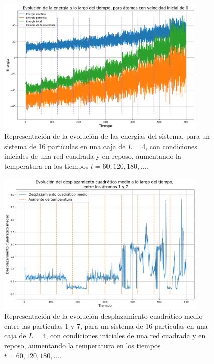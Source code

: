 \documentclass[11pt, twoside]{article} %
\begin{document}
\begin{figure}[h!]
    \centering
    \includegraphics[width=0.9\textwidth]{plots/energia_temp_crit.png}
    \caption{Representación de la evolución de las energías del sistema, para un sistema
    de 16 partículas en una caja de $L=4$, con condiciones iniciales de una red cuadrada 
    y en reposo, aumentando la temperatura en los tiempos $t=60, 120, 180, ...$.}
    \label{fig:energia_temp_crit}
\end{figure}

\begin{figure}[h!]
    \centering
    \includegraphics[width=0.9\textwidth]{plots/desplazamiento_temp_crit.png}
    \caption{Representación de la evolución desplazamiento cuadrático medio entre las 
    partículas 1 y 7, para un sistema de 16 partículas en una caja de $L=4$, con condiciones iniciales de una red cuadrada 
    y en reposo, aumentando la temperatura en los tiempos $t=60, 120, 180, ...$.}
    \label{fig:desplazamiento_cuadratico_medio_1_7}
\end{figure}
\end{document}
